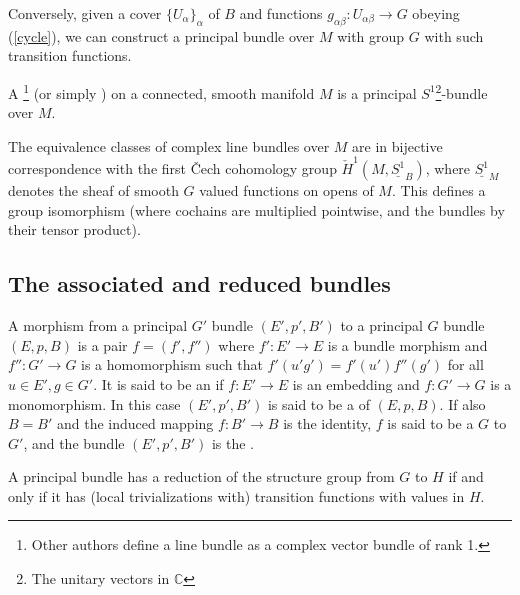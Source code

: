 Conversely, given a cover $\{U_{\alpha} \}_\alpha$ of $B$ and functions $g_{\alpha\beta}:U_{\alpha\beta}\rightarrow G$ obeying (\ref{cycle}), we can construct a principal bundle over $M$ with group $G$ with such transition functions. 

\begin{example}
 A \footnote{Other authors define a line bundle as a complex vector bundle of rank 1.} (or simply ) on a connected, smooth manifold $M$ is a principal $S^1$\footnote{The unitary vectors in $\mathbb{C}$}-bundle over $M$.

 The equivalence classes of complex line bundles over $M$ are in bijective correspondence with the first \v{C}ech cohomology group $\check{H}^1(M,\underline{S^1}_B)$, where $\underline{S^1}_M$ denotes the sheaf of smooth $G$ valued functions on opens of $M$. This defines a group isomorphism (where cochains are multiplied pointwise, and the bundles by their tensor product).
\end{example}


\subsection{The associated and reduced bundles}

\begin{definition}
  A morphism from a principal $G'$ bundle $(E',p',B')$ to a principal $G$ bundle $(E,p,B)$ is a pair $f=(f',f'')$ where $f':E'\rightarrow E$ is a bundle morphism and $f'':G'\rightarrow G$ is a homomorphism such that $ f'(u'g')= f'(u')f''(g')$ for all $u\in E',g\in G'$. It is said to be an  if $f:E'\rightarrow E$ is an embedding and $f:G'\rightarrow G$ is a monomorphism. In this case $(E',p',B')$ is said to be a  of $(E,p,B)$. If also $B=B'$ and the induced mapping $f:B'\rightarrow B$ is the identity, $f$ is said to be a  $G$ to $G'$, and the bundle $(E',p',B')$ is the .
\end{definition}

\begin{prop}\label{redprop}
A principal bundle has a reduction of the structure group from $G$ to $H$ if and only if it has (local trivializations with) transition functions with values in $H$.
\end{prop}

